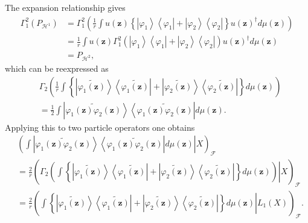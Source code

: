 \documentclass[aps,preprint]{revtex4}%
\begin{document}
The expansion relationship gives
\begin{align}
\Gamma_{1}^{2}\left(  P_{\mathcal{H}^{1}}\right)   &  =\Gamma_{1}^{2}\left(
\frac{1}{r}\int u\left(  \mathbf{z}\right)  \left\{  \left\vert \varphi
_{1}\right\rangle \left\langle \varphi_{1}\right\vert +\left\vert \varphi
_{2}\right\rangle \left\langle \varphi_{2}\right\vert \right\}  u\left(
\mathbf{z}\right)  ^{\dagger}d\mu\left(  \mathbf{z}\right)  \right)
\nonumber\\
&  =\frac{1}{r}\int u\left(  \mathbf{z}\right)  \Gamma_{1}^{2}\left(
\left\vert \varphi_{1}\right\rangle \left\langle \varphi_{1}\right\vert
+\left\vert \varphi_{2}\right\rangle \left\langle \varphi_{2}\right\vert
\right)  u\left(  \mathbf{z}\right)  ^{\dagger}d\mu\left(  \mathbf{z}\right)
\nonumber\\
&  =P_{\mathcal{H}^{2}},
\end{align}
which can be reexpressed as
\begin{align}
&  \Gamma_{2}\left(  \frac{1}{r}\int\left\{  \left\vert \widetilde{\varphi
_{1}\left(  \mathbf{z}\right)  }\right\rangle \left\langle \widetilde{\varphi
_{1}\left(  \mathbf{z}\right)  }\right\vert +\left\vert \widetilde{\varphi
_{2}\left(  \mathbf{z}\right)  }\right\rangle \left\langle \widetilde{\varphi
_{2}\left(  \mathbf{z}\right)  }\right\vert \right\}  d\mu\left(
\mathbf{z}\right)  \right) \nonumber\\
&  =\frac{1}{2}\int\left\vert \widetilde{\varphi_{1}\left(  \mathbf{z}\right)
\varphi_{2}\left(  \mathbf{z}\right)  }\right\rangle \left\langle
\widetilde{\varphi_{1}\left(  \mathbf{z}\right)  \varphi_{2}\left(
\mathbf{z}\right)  }\right\vert d\mu\left(  \mathbf{z}\right)  .
\end{align}
Applying this to two particle operators one obtains
\begin{align}
&  \left(  \left.  \int\left\vert \widetilde{\varphi_{1}\left(  \mathbf{z}%
\right)  \varphi_{2}\left(  \mathbf{z}\right)  }\right\rangle \left\langle
\widetilde{\varphi_{1}\left(  \mathbf{z}\right)  \varphi_{2}\left(
\mathbf{z}\right)  }\right\vert d\mu\left(  \mathbf{z}\right)  \right\vert
X\right)  _{\mathcal{F}}\nonumber\\
&  =\frac{2}{r}\left(  \left.  \Gamma_{2}\left(  \int\left\{  \left\vert
\widetilde{\varphi_{1}\left(  \mathbf{z}\right)  }\right\rangle \left\langle
\widetilde{\varphi_{1}\left(  \mathbf{z}\right)  }\right\vert +\left\vert
\widetilde{\varphi_{2}\left(  \mathbf{z}\right)  }\right\rangle \left\langle
\widetilde{\varphi_{2}\left(  \mathbf{z}\right)  }\right\vert \right\}
d\mu\left(  \mathbf{z}\right)  \right)  \right\vert X\right)  _{\mathcal{F}%
}\nonumber\\
&  =\frac{2}{r}\left(  \left.  \int\left\{  \left\vert \widetilde{\varphi
_{1}\left(  \mathbf{z}\right)  }\right\rangle \left\langle \widetilde{\varphi
_{1}\left(  \mathbf{z}\right)  }\right\vert +\left\vert \widetilde{\varphi
_{2}\left(  \mathbf{z}\right)  }\right\rangle \left\langle \widetilde{\varphi
_{2}\left(  \mathbf{z}\right)  }\right\vert \right\}  d\mu\left(
\mathbf{z}\right)  \right\vert L_{1}\left(  X\right)  \right)  _{\mathcal{F}}.
\end{align}
\end{document}
